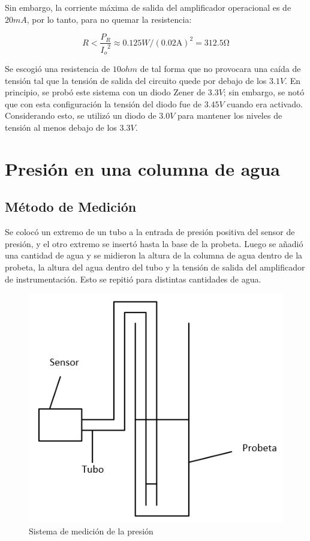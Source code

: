 Sin embargo, la corriente máxima de salida del amplificador operacional es de $20 mA$, por lo tanto, para no quemar la resistencia:

\begin{equation*}
R<\frac{P_R}{{I_o}^2}\approx 0.125 W/{(0.02\si{\ampere})}^2=312.5 \si{\ohm}
\end{equation*}

Se escogió una resistencia de $10\si{ohm}$ de tal forma que no provocara una caída de tensión tal que la tensión de salida del circuito quede por debajo de los $3.1V$. En principio, se probó este sistema con un diodo Zener de $3.3 V$; sin embargo, se notó que con esta configuración la tensión del diodo fue de $3.45 V$ cuando era activado. Considerando esto, se utilizó un diodo de $3.0V$ para mantener los niveles de tensión al menos debajo de los $3.3V$.

\section{Presión en una columna de agua}
\subsection{Método de Medición}
Se colocó un extremo de un tubo a la entrada de presión positiva del sensor de presión, y el otro extremo se insertó hasta la base de la probeta. Luego se añadió una cantidad de agua y se midieron la altura de la columna de agua dentro de la probeta, la altura del agua dentro del tubo y la tensión de salida del amplificador de instrumentación. Esto se repitió para distintas cantidades de agua.

\begin{figure}[ht]
\begin{center}
\includegraphics[scale=0.5]{./res/probeta.png}
\caption{Sistema de medición de la presión}
\end{center}
\end{figure}

